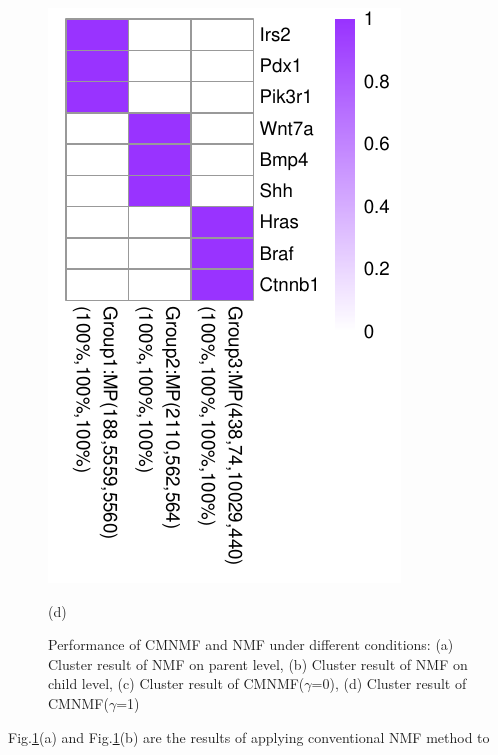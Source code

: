 \documentclass{bmcart}
\begin{document}
\begin{figure}[!h]
\begin{minipage}{.20\linewidth}
   \includegraphics[width=\linewidth]{DrawPictures/v4.pdf}
    \centerline{(d)}
  \end{minipage}
  \caption{Performance of CMNMF and NMF under different conditions: (a) Cluster result of NMF on parent level, (b) Cluster result of NMF on child level, (c) Cluster result of CMNMF($\gamma$=0), (d) Cluster result of CMNMF($\gamma$=1)}
  \label{fig:sampled_result}
\end{figure}
 Fig.\ref{fig:sampled_result}(a) and Fig.\ref{fig:sampled_result}(b) are the results of applying conventional NMF method to
\end{document}
